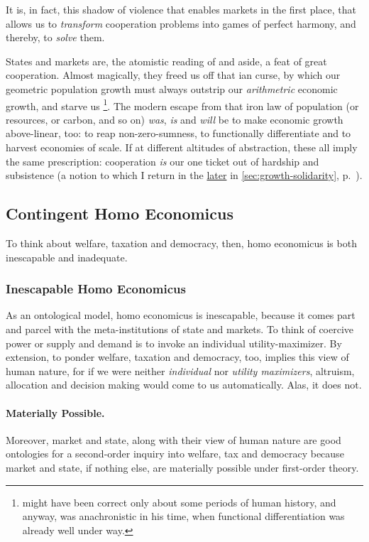 It is, in fact, this shadow of violence that enables markets in the first place, that allows us to \emph{transform} cooperation problems into games of perfect harmony, and thereby, to \emph{solve} them.

States and markets are, the atomistic reading of \citeauthor{Hobbes-1651-aa} and \citeauthor{Smith-1776-lq} aside, a feat of great cooperation.
Almost magically, they freed us off that \citeauthor{Malthus1798}ian curse, by which our geometric population growth must always outstrip our \emph{arithmetric} economic growth, and starve us
\footnote{
	\cite{Malthus1798} might have been correct only about some periods of human history, and anyway, was anachronistic in his time, when functional differentiation was already well under way.
}.
The modern escape from that iron law of population (or resources, or carbon, and so on) \emph{was}, \emph{is} and \emph{will} be to make economic growth above-linear, too: to reap non-zero-sumness, to functionally differentiate and to harvest economies of scale.
If at different altitudes of abstraction, these all imply the same prescription: cooperation \emph{is} our one ticket out of hardship and subsistence (a notion to which I return in the \hyperref[sec:growth-solidarity]{later} in \autoref{sec:growth-solidarity}, p.~\pageref{sec:growth-solidarity}).

\subsection{Contingent Homo Economicus} \label{sec:contingent-homo-economicus}
To think about welfare, taxation and democracy, then, homo economicus is both inescapable and inadequate.

\subsubsection{Inescapable Homo Economicus}
As an ontological model, homo economicus is inescapable, because it comes part and parcel with the meta-institutions of state and markets.
To think of coercive power or supply and demand is to invoke an individual utility-maximizer.
By extension, to ponder welfare, taxation and democracy, too, implies this view of human nature, for if we were neither \emph{individual} nor \emph{utility maximizers}, altruism, allocation and decision making would come to us automatically.
Alas, it does not.

\paragraph{Materially Possible.}
Moreover, market and state, along with their view of human nature are good ontologies for a second-order inquiry into welfare, tax and democracy because market and state, if nothing else, are materially possible under first-order theory. %

